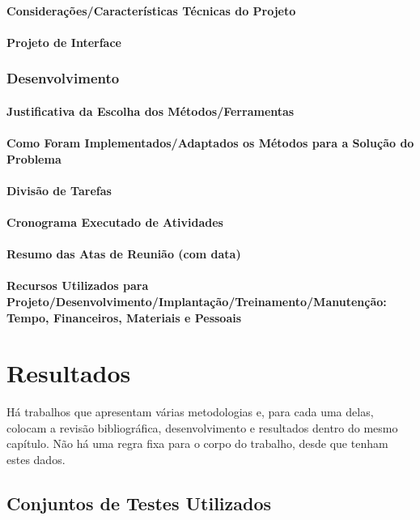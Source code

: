 \documentclass[openright]{ifrs} %
\begin{document}
\subsubsection{Considerações/Características Técnicas do Projeto}
\subsubsection{Projeto de Interface}
\subsection{Desenvolvimento}
\subsubsection{Justificativa da Escolha dos Métodos/Ferramentas}
\subsubsection{Como Foram Implementados/Adaptados os Métodos para a Solução do Problema}
\subsubsection{Divisão de Tarefas}
\subsubsection{Cronograma Executado de Atividades}
\subsubsection{Resumo das Atas de Reunião (com data)}
\subsubsection{Recursos Utilizados para Projeto/Desenvolvimento/Implantação/Treinamento/Manutenção:
Tempo, Financeiros, Materiais e Pessoais}

\chapter{Resultados}
Há trabalhos que apresentam várias metodologias e, para cada uma delas, colocam a revisão bibliográfica, desenvolvimento e resultados dentro do mesmo capítulo. Não há uma regra fixa para o corpo do trabalho, desde que tenham estes dados. 
\section{Conjuntos de Testes Utilizados}
\end{document}
